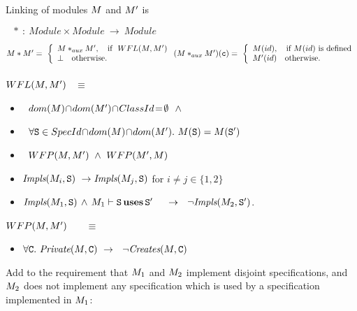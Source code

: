 \begin{definition}[Linking]
\label{formal:Linking}
Linking  of  modules $M$ and $M{'}$ is

\noindent $\ \ \ * \ : \ Module \times Module \ \longrightarrow \ Module  $
\noindent

$
\M * \M{'}  =\ \left\{
\begin{array}{l}
                        \M *_{aux} \M{'},\ \ \   \hbox{if}\  \ WFL(\M,\M{'})\\
\bot  \ \ \ \mbox{otherwise.}
\end{array}
                    \right.\\
                    \\
(\M *_{aux} \M{'})(\clss{}) =\ \left\{
\begin{array}{l}
 \M(id),\ \ \ \mbox{if }
\M(id) \mbox{ is defined}\\
\M{'}(id) \ \ \  \mbox{otherwise.}
\end{array}
                    \right.
                    $
\\
\\
{$WFL(M,M{'})$ }    \ $\equiv $ \\ 

\begin{itemize}
\item
$ ~ $   $dom(\M)\!\cap\!dom(\M{'})\!\cap\!\syntax{ClassId}\!=\!\emptyset\ \ \wedge\ $ 
\item $ ~ $   $\forall {\ensuremath{\textrm{\ttfamily{S}}}}\in {SpecId}\!\cap\! dom(M)\!\cap\! dom(M{'}).\  M({\textrm{\ttfamily{S}}})=M({\textrm{\ttfamily{S}}}')  $ 
\item $ ~ $  $WFP(\M,\M') \ \wedge  \ WFP(\M',\M)$
\item
    ${\textrm{{\it {Impls}}}}({M_i},{{\textrm{\ttfamily{S}}}}) \ \rightarrow {\textrm{{\it {Impls}}}}({M_j},{{\textrm{\ttfamily{S}}}})$ for $i\neq j\in \{1,2\}$
\item
   ${\textrm{{\it {Impls}}}}({M_1},{{\textrm{\ttfamily{S}}}}) \,\wedge\, M_1 \vdash {\ensuremath{\textrm{\ttfamily{S}}}} \,\textbf{\textrm{uses}}\, {\textrm{\ttfamily{S}}}'\ \   \ \ \rightarrow \ \ \neg {\textrm{{\it {Impls}}}}({M_2},{{\textrm{\ttfamily{S}}}'})$.
 \end{itemize}  
 
{$WFP(M,M')$ } \ \   \ $\equiv $ \ \\

 \begin{itemize}
\item
 $ \forall \prg{C}.  \ \Private{\M}{\prg{C}} \ \rightarrow \ \ \neg \Creates{\M}{\prg{C}}$
  \end{itemize}  
\end{definition}



Add to the requirement that $M_1$ and $M_2$ implement disjoint specifications, and $M_2$ does not implement any specification which is used by a specification implemented  in $M_1$:
 
